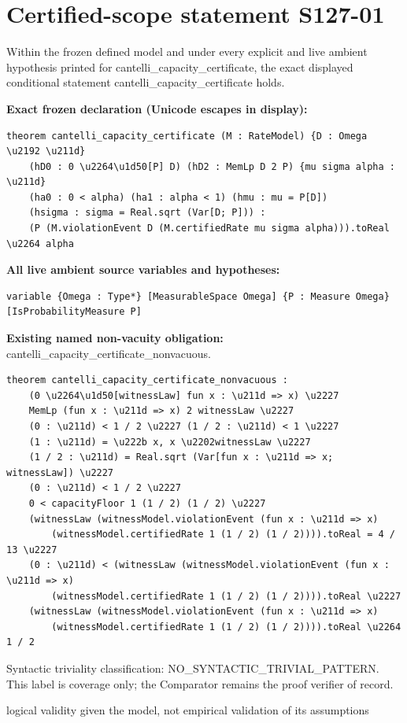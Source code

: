 \documentclass[11pt]{article}
\begin{document}
\section*{Certified-scope statement S127-01}
Within the frozen defined model and under every explicit and live ambient hypothesis printed for cantelli\_\allowbreak{}capacity\_\allowbreak{}certificate, the exact displayed conditional statement cantelli\_\allowbreak{}capacity\_\allowbreak{}certificate holds.
\par\noindent\textbf{Exact frozen declaration (Unicode escapes in display):}
\begin{Verbatim}[breaklines=true,breakanywhere=true,fontsize=\scriptsize]
theorem cantelli_capacity_certificate (M : RateModel) {D : Omega \u2192 \u211d}
    (hD0 : 0 \u2264\u1d50[P] D) (hD2 : MemLp D 2 P) {mu sigma alpha : \u211d}
    (ha0 : 0 < alpha) (ha1 : alpha < 1) (hmu : mu = P[D])
    (hsigma : sigma = Real.sqrt (Var[D; P])) :
    (P (M.violationEvent D (M.certifiedRate mu sigma alpha))).toReal \u2264 alpha
\end{Verbatim}
\noindent\textbf{All live ambient source variables and hypotheses:}
\begin{Verbatim}[breaklines=true,breakanywhere=true,fontsize=\scriptsize]
variable {Omega : Type*} [MeasurableSpace Omega] {P : Measure Omega} [IsProbabilityMeasure P]
\end{Verbatim}
\noindent\textbf{Existing named non-vacuity obligation:} cantelli\_\allowbreak{}capacity\_\allowbreak{}certificate\_\allowbreak{}nonvacuous.
\begin{Verbatim}[breaklines=true,breakanywhere=true,fontsize=\scriptsize]
theorem cantelli_capacity_certificate_nonvacuous :
    (0 \u2264\u1d50[witnessLaw] fun x : \u211d => x) \u2227
    MemLp (fun x : \u211d => x) 2 witnessLaw \u2227
    (0 : \u211d) < 1 / 2 \u2227 (1 / 2 : \u211d) < 1 \u2227
    (1 : \u211d) = \u222b x, x \u2202witnessLaw \u2227
    (1 / 2 : \u211d) = Real.sqrt (Var[fun x : \u211d => x; witnessLaw]) \u2227
    (0 : \u211d) < 1 / 2 \u2227
    0 < capacityFloor 1 (1 / 2) (1 / 2) \u2227
    (witnessLaw (witnessModel.violationEvent (fun x : \u211d => x)
        (witnessModel.certifiedRate 1 (1 / 2) (1 / 2)))).toReal = 4 / 13 \u2227
    (0 : \u211d) < (witnessLaw (witnessModel.violationEvent (fun x : \u211d => x)
        (witnessModel.certifiedRate 1 (1 / 2) (1 / 2)))).toReal \u2227
    (witnessLaw (witnessModel.violationEvent (fun x : \u211d => x)
        (witnessModel.certifiedRate 1 (1 / 2) (1 / 2)))).toReal \u2264 1 / 2
\end{Verbatim}
\noindent Syntactic triviality classification: NO\_\allowbreak{}SYNTACTIC\_\allowbreak{}TRIVIAL\_\allowbreak{}PATTERN. This label is coverage only; the Comparator remains the proof verifier of record.
\par\noindent logical validity given the model, not empirical validation of its assumptions
\end{document}
